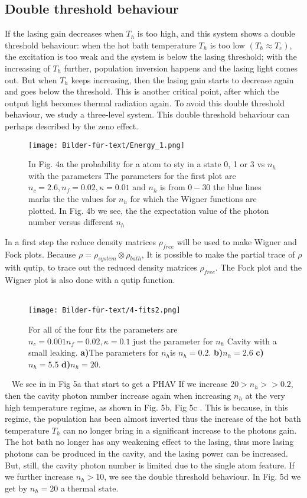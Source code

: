 \documentclass[12pt,a4paper]{article}
\begin{document}
\subsection{Double threshold behaviour}
If the lasing gain decreases when $T_h$ is too high, and this system shows a double threshold behaviour: when the hot bath temperature $T_h$ is
too low $(T_h \approx T_c)$, the excitation is too weak and the system
is below the lasing threshold; with the increasing of $T_h$ further, population inversion happens and the lasing light comes out. But when $T_h$ keeps increasing, then the lasing gain starts to decrease again and goes below the threshold. This is another critical point, after which the output light becomes thermal radiation again.
To avoid this double threshold behaviour, we study a three-level system.
This double threshold behaviour can perhaps described by the zeno effect.

\begin{figure}[h!]

\hspace{-1cm}
\texttt{[image: Bilder-für-text/Energy\_1.png]}
\caption{In Fig. 4a the probability for a atom to sty in a state 0, 1 or 3 vs $n_h$ with the parameters The parameters for the first plot are $n_c=2.6 ,n_f=0.02,\kappa=0.01 $ and $n_h$ is from $0-30$ the blue lines marks the the values for $ n_h$ for which the Wigner functions are plotted. In Fig. 4b we see, the the expectation value of the photon number versus different $n_h$ }
\end{figure}

In a first step the reduce density matrices $\rho_{free}$ will be used to make Wigner and Fock plots.
Because $\rho=\rho_{system}\otimes \rho_{bath}$, It is possible to make the partial trace of $\rho$ with qutip, to trace out the reduced density matrices $\rho_{free}$. The Fock plot and the Wigner plot is also done with a qutip function.\\
\ \newpage
\ \newpage
\begin{figure}[h!]
\hspace{-0cm}
\texttt{[image: Bilder-für-text/4-fits2.png]}
\caption{For all of the four fits the parameters are $n_c=0.001 n_f=0.02,\kappa=0.1$ just the parameter for $n_h$ Cavity with a small leaking.
\textbf{a)}The parameters for $n_h$is $n_h=0.2 $.
\textbf{b)}$ n_h=2.6$ 
\textbf{c)} $ n_h=5.5$ 
\textbf{d)}$ n_h=20$. 
}
\end{figure}
\ \newpage
We see in in Fig 5a that start to get a PHAV
If we increase  $20>n_h >>0.2 $,
then the cavity photon number increase again when increasing $n_h$ at the very
high temperature regime, as shown in Fig. 5b, Fig 5c . This is because,
in this regime, the population has been almost inverted
thus the increase of the hot bath temperature $T_h$
can no longer bring in a significant increase to the photons gain.
The hot bath no longer has
any weakening effect to the lasing, thus more lasing photons
can be produced in the cavity, and the lasing power can be
increased. But, still, the cavity photon number is limited due to
the single atom feature.
If we further increase  $n_h >10$, we see the double threshold behaviour. 
In Fig. 5d we get by $n_h=20$ a thermal state.
\end{document}
